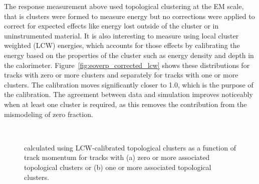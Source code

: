 The response measurement above used topological clustering at the EM scale, that is clusters were formed to measure energy but no corrections were applied to correct for expected effects like energy lost outside of the cluster or in uninstrumented material. 
It is also interesting to measure \epcor using local cluster weighted (LCW) energies, which accounts for those effects by calibrating the energy based on the properties of the cluster such as energy density and depth in the calorimeter.
Figure~\ref{fig:eoverp_corrected_lcw} shows these distributions for tracks with zero or more clusters and separately for tracks with one or more clusters.
The calibration moves \epcor significantly closer to 1.0, which is the purpose of the calibration.
The agreement between data and simulation improves noticeably when at least one cluster is required, as this removes the contribution from the mismodeling of zero fraction. 

\begin{figure}[h]
\centering
{}
~
\caption{\epcor calculated using LCW-calibrated topological clusters as a function of track momentum for tracks with (a) zero or more associated topological clusters or (b) one or more associated topological clusters.}
\label{fig-eoverp_corrected_lcw}
\end{figure}


